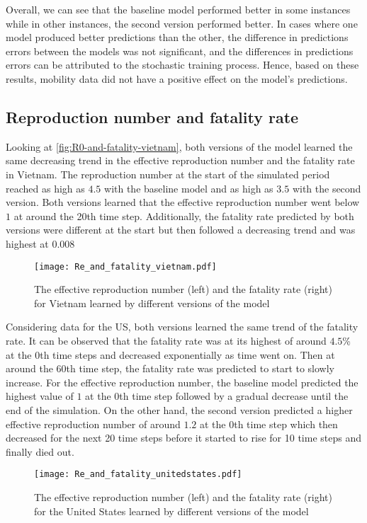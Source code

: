 Overall, we can see that the baseline model performed better in some instances while in other instances, the second version performed better.
In cases where one model produced better predictions than the other, the difference in predictions errors between the models was not significant, and the differences in predictions errors can be attributed to the stochastic training process.
Hence, based on these results, mobility data did not have a positive effect on the model's predictions.

\subsection{Reproduction number and fatality rate}

Looking at \autoref{fig:R0-and-fatality-vietnam}, both versions of the model learned the same decreasing trend in the effective reproduction number and the fatality rate in Vietnam.
The reproduction number at the start of the simulated period reached as high as $4.5$ with the baseline model and as high as $3.5$ with the second version.
Both versions learned that the effective reproduction number went below $1$ at around the 20th time step.
Additionally, the fatality rate predicted by both versions were different at the start but then followed a decreasing trend and was highest at $0.008$

\begin{figure}[!htb]
    \centering
    \texttt{[image: Re\_and\_fatality\_vietnam.pdf]}
    \caption[Learnt effective reproduction number and fatality rate for Vietnam]{The effective reproduction number (left) and the fatality rate (right) for Vietnam learned by different versions of the model}
    \label{fig:R0-and-fatality-vietnam}
\end{figure}

Considering data for the \gls{US}, both versions learned the same trend of the fatality rate.
It can be observed that the fatality rate was at its highest of around $4.5$\% at the 0th time steps and decreased exponentially as time went on.
Then at around the 60th time step, the fatality rate was predicted to start to slowly increase.
For the effective reproduction number, the baseline model predicted the highest value of $1$ at the 0th time step followed by a gradual decrease until the end of the simulation.
On the other hand, the second version predicted a higher effective reproduction number of around $1.2$ at the 0th time step which then decreased for the next 20 time steps before it started to rise for 10 time steps and finally died out.

\begin{figure}[!htb]
    \centering
    \texttt{[image: Re\_and\_fatality\_unitedstates.pdf]}
    \caption[Learnt effective reproduction number and fatality rate for the US]{The effective reproduction number (left) and the fatality rate (right) for the United States learned by different versions of the model}
    \label{fig:R0-and-fatality-usa}
\end{figure}
